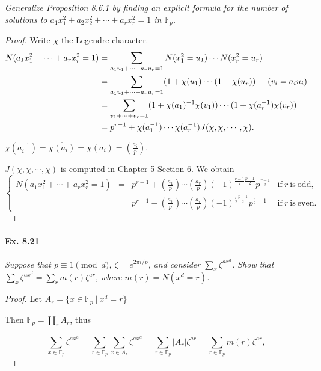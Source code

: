 \documentclass[11pt,a4paper]{article}
\newcommand{\F}{\mathbb{F}}
\newcommand{\legendre}[2]{\genfrac{(}{)}{}{}{#1}{#2}}
\begin{document}
{{\it Generalize Proposition 8.6.1 by finding an explicit formula for the number of solutions to $a_1x_1^2+a_2x_2^2+\cdots+a_rx_r^2 = 1$ in $\F_p$.
}

\begin{proof}
Write $\chi$ the Legendre character.
\begin{align*}
N(a_1x_1^2+\cdots+a_r x_r^2=1)&=\sum\limits_{a_1u_1+\cdots+a_r u_r=1}N(x_1^2=u_1)\cdots N(x_r^2=u_r)\\
&=\sum\limits_{a_1u_1+\cdots+a_r u_r=1}(1+\chi(u_1)\cdots(1+\chi(u_r))  \hspace{0.5cm}(v_i = a_i u_i)\\
&=\sum\limits_{v_1+\cdots+v_r=1}(1+\chi(a_1)^{-1}\chi(v_1))\cdots(1+\chi(a_r^{-1})\chi(v_r))\\
&=p^{r-1} + \chi(a_1^{-1})\cdots\chi(a_r^{-1})J(\chi,\chi,\cdots,\chi).
\end{align*}

$\chi(a_i^{-1}) = \overline{\chi(a_i)} = \chi(a_i) = \legendre{a_i}{p}.$

$J(\chi,\chi,\cdots,\chi)$ is computed in Chapter 5 Section 6. We obtain
$$
\left\{
\begin{array}{ccll}
 N(a_1x_1^2+\cdots+a_r x_r^2=1)  & =  & p^{r-1}+\legendre{a_1}{p}\cdots\legendre{a_r}{p}(-1)^{\frac{r-1}{2}\frac{p-1}{2}}p^{\frac{r-1}{2}}&\mathrm{if}\ r\ \mathrm{is}\ \mathrm{odd}, \\
  &  = &p^{r-1}-\legendre{a_1}{p}\cdots\legendre{a_r}{p}(-1)^{\frac{r}{2}\frac{p-1}{2}}p^{\frac{r}{2}-1}&\mathrm{if}\ r\  \mathrm{is}\ \mathrm{even}.
\end{array}
\right.
$$
\end{proof}

\paragraph{Ex. 8.21}

{\it Suppose that $p\equiv 1 \pmod d$, $\zeta = e^{2\pi i/p}$, and consider $\sum_x \zeta^{ax^d}$. Show that $\sum_x \zeta^{ax^d} = \sum_r m(r)\zeta^{ar}$, where $m(r) = N(x^d = r)$.
}

\begin{proof}
Let $A_r = \{x \in \mathbb{F}_p \ \vert \ x^d=r\}$

Then  $\mathbb{F}_p = \coprod_r A_r$, thus

$$\sum\limits_{x\in \mathbb{F}_p} \zeta^{ax^d} = \sum\limits_{r \in \mathbb{F}_p} \sum\limits_{x \in A_r} \zeta^{a x^d} = \sum\limits_{r \in \mathbb{F}_p} \vert A_r\vert \zeta^{ar}= \sum\limits_{r \in \mathbb{F}_p} m(r)\zeta^{ar},$$


\end{proof}}
\end{document}
